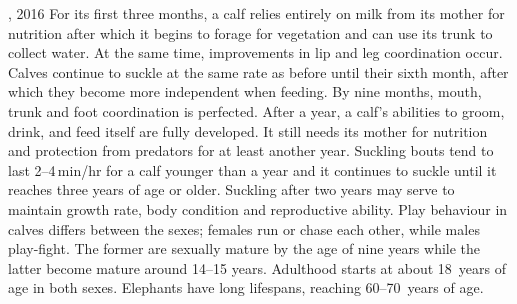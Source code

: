 \begin{exercise}
\begin{quoted}{, 2016}
For its first three months, a calf relies entirely on milk from its mother for nutrition after which it begins to forage for vegetation and can use its trunk to collect water.  At the same time, improvements in lip and leg coordination occur.  Calves continue to suckle at the same rate as before until their sixth month, after which they become more independent when feeding.  By nine months, mouth, trunk and foot coordination is perfected.  After a year, a calf's abilities to groom, drink, and feed itself are fully developed.  It still needs its mother for nutrition and protection from predators for at least another year.  Suckling bouts tend to last 2--4\,min/hr for a calf younger than a year and it continues to suckle until it reaches three years of age or older.  Suckling after two years may serve to maintain growth rate, body condition and reproductive ability.  Play behaviour in calves differs between the sexes; females run or chase each other, while males play-fight. The former are sexually mature by the age of nine years while the latter become mature around 14--15 years.  Adulthood starts at about 18~years of age in both sexes.  Elephants have long lifespans, reaching 60--70~years of age.
\end{quoted}
\end{exercise}






